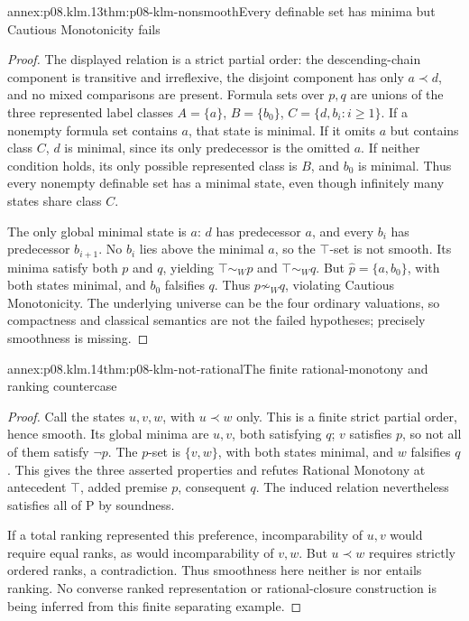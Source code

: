 \begin{annexitem}{annex:p08.klm.13}{thm:p08-klm-nonsmooth}{Every definable set has minima but Cautious Monotonicity fails}
\begin{proof}
The displayed relation is a strict partial order: the descending-chain
component is transitive and irreflexive, the disjoint component has only
\(a\prec d\), and no mixed comparisons are present.
Formula sets over \(p,q\) are unions of the three represented label
classes \(A=\{a\}\), \(B=\{b_0\}\),
\(C=\{d,b_i:i\geq1\}\). If a nonempty formula set contains \(a\),
that state is minimal. If it omits \(a\) but contains class \(C\),
\(d\) is minimal, since its only predecessor is the omitted \(a\).
If neither condition holds, its only possible represented class is
\(B\), and \(b_0\) is minimal. Thus every nonempty definable set
has a minimal state, even though infinitely many states share class \(C\).

The only global minimal state is \(a\): \(d\) has predecessor
\(a\), and every \(b_i\) has predecessor \(b_{i+1}\).
No \(b_i\) lies above the minimal \(a\), so the \(\top\)-set
is not smooth. Its minima satisfy both \(p\) and \(q\), yielding
\(\top\sim_W p\) and \(\top\sim_W q\).
But \(\widehat p=\{a,b_0\}\), with both states minimal, and
\(b_0\) falsifies \(q\). Thus \(p\not\sim_W q\), violating
Cautious Monotonicity. The underlying universe can be the four ordinary
valuations, so compactness and classical semantics are not the failed
hypotheses; precisely smoothness is missing.
\end{proof}
\end{annexitem}

\begin{annexitem}{annex:p08.klm.14}{thm:p08-klm-not-rational}{The finite rational-monotony and ranking countercase}
\begin{proof}
Call the states \(u,v,w\), with \(u\prec w\) only. This is a
finite strict partial order, hence smooth. Its global minima are
\(u,v\), both satisfying \(q\); \(v\) satisfies \(p\), so not
all of them satisfy \(\neg p\). The \(p\)-set is \(\{v,w\}\),
with both states minimal, and \(w\) falsifies \(q\).
This gives the three asserted properties and refutes Rational Monotony
at antecedent \(\top\), added premise \(p\), consequent \(q\).
The induced relation nevertheless satisfies all of P by soundness.

If a total ranking represented this preference, incomparability of
\(u,v\) would require equal ranks, as would incomparability of
\(v,w\). But \(u\prec w\) requires strictly ordered ranks, a
contradiction. Thus smoothness here neither is nor entails ranking.
No converse ranked representation or rational-closure construction is
being inferred from this finite separating example.
\end{proof}
\end{annexitem}


